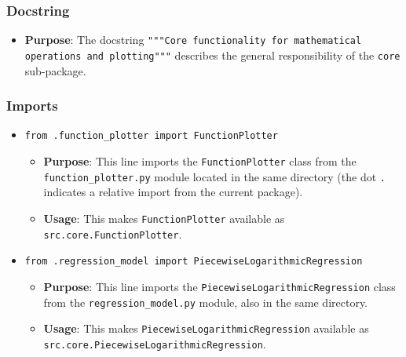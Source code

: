 \documentclass[12pt,a4paper]{report}
\begin{document}
\subsubsection{Docstring}
\begin{itemize}
    \item \textbf{Purpose}: The docstring \texttt{"""Core functionality for mathematical operations and plotting"""} describes the general responsibility of the \texttt{core} sub-package.
\end{itemize}

\subsubsection{Imports}
\begin{itemize}
    \item \texttt{from .function\_plotter import FunctionPlotter}
        \begin{itemize}
            \item \textbf{Purpose}: This line imports the \texttt{FunctionPlotter} class from the \texttt{function\_plotter.py} module located in the same directory (the dot \texttt{.} indicates a relative import from the current package).
            \item \textbf{Usage}: This makes \texttt{FunctionPlotter} available as \texttt{src.core.FunctionPlotter}.
        \end{itemize}
    \item \texttt{from .regression\_model import PiecewiseLogarithmicRegression}
        \begin{itemize}
            \item \textbf{Purpose}: This line imports the \texttt{PiecewiseLogarithmicRegression} class from the \texttt{regression\_model.py} module, also in the same directory.
            \item \textbf{Usage}: This makes \texttt{PiecewiseLogarithmicRegression} available as \texttt{src.core.PiecewiseLogarithmicRegression}.
        \end{itemize}
\end{itemize}
\end{document}
